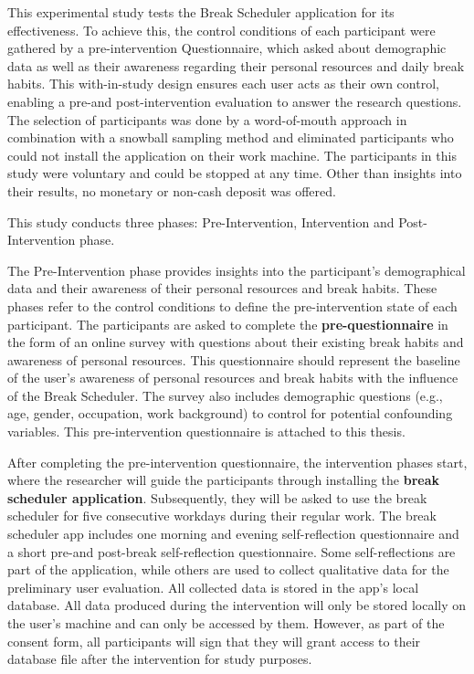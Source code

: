 \documentclass{hasel_thesis}
\begin{document}
This experimental study tests the Break Scheduler application for its effectiveness. To achieve this, the control conditions of each participant were gathered by a pre-intervention Questionnaire, which asked about demographic data as well as their awareness regarding their personal resources and daily break habits. This with-in-study design ensures each user acts as their own control, enabling a pre-and post-intervention evaluation to answer the research questions. The selection of participants was done by a word-of-mouth approach in combination with a snowball sampling method and eliminated participants who could not install the application on their work machine. The participants in this study were voluntary and could be stopped at any time. Other than insights into their results, no monetary or non-cash deposit was offered.

This study conducts three phases: Pre-Intervention, Intervention and Post-Intervention phase. 

The Pre-Intervention phase provides insights into the participant's demographical data and their awareness of their personal resources and break habits. These phases refer to the control conditions to define the pre-intervention state of each participant. The participants are asked to complete the \textbf{pre-questionnaire} in the form of an online survey with questions about their existing break habits and awareness of personal resources. This questionnaire should represent the baseline of the user's awareness of personal resources and break habits with the influence of the Break Scheduler. The survey also includes demographic questions (e.g., age, gender, occupation, work background) to control for potential confounding variables. This pre-intervention questionnaire is attached to this thesis.

After completing the pre-intervention questionnaire, the intervention phases start, where the researcher will guide the participants through installing the \textbf{break scheduler application}. Subsequently, they will be asked to use the break scheduler for five consecutive workdays during their regular work. The break scheduler app includes one morning and evening self-reflection questionnaire and a short pre-and post-break self-reflection questionnaire. Some self-reflections are part of the application, while others are used to collect qualitative data for the preliminary user evaluation. All collected data is stored in the app's local database. All data produced during the intervention will only be stored locally on the user's machine and can only be accessed by them. However, as part of the consent form, all participants will sign that they will grant access to their database file after the intervention for study purposes.
\end{document}
